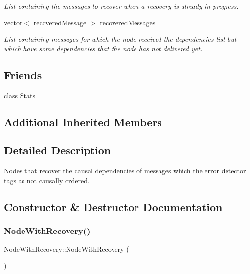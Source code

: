 \begin{DoxyCompactItemize}
\begin{DoxyCompactList}\small\item\em List containing the messages to recover when a recovery is already in progress. \end{DoxyCompactList}\item 
vector$<$ \hyperlink{_node_with_recovery_8h_abc64f7ff8d329883ae93979292b1c996}{recovered\+Message} $>$ \hyperlink{class_node_with_recovery_adf6b319a727cd9ec43a6cc68cbf99bbb}{recovered\+Messages}
\begin{DoxyCompactList}\small\item\em List containing messages for which the node received the dependencies list but which have some dependencies that the node has not delivered yet. \end{DoxyCompactList}\end{DoxyCompactItemize}
\subsection*{Friends}
\begin{DoxyCompactItemize}
\item 
class \hyperlink{class_node_with_recovery_a129f65b6976377739eb6231b6962985e}{Stats}
\end{DoxyCompactItemize}
\subsection*{Additional Inherited Members}


\subsection{Detailed Description}
Nodes that recover the causal dependencies of messages which the error detector tags as not causally ordered. 



\subsection{Constructor \& Destructor Documentation}
\mbox{\label{class_node_with_recovery_aed1d9b2cfa7729902c90c103ab3075ff}} 
\subsubsection{\texorpdfstring{Node\+With\+Recovery()}{NodeWithRecovery()}}
{\footnotesize\ttfamily Node\+With\+Recovery\+::\+Node\+With\+Recovery (\begin{DoxyParamCaption}{ }\end{DoxyParamCaption})}

